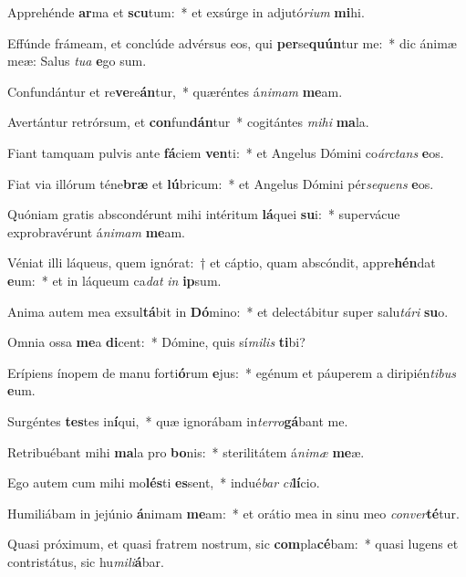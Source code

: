 \item Apprehénde \textbf{ar}ma et \textbf{scu}tum:~* et exsúrge in adjutó\textit{ri}\textit{um} \textbf{mi}hi.
\item Effúnde frámeam, et conclúde advérsus eos, qui \textbf{per}se\textbf{quún}tur me:~* dic ánimæ meæ: Salus \textit{tu}\textit{a} \textbf{e}go sum.
\item Confundántur et re\textbf{ve}re\textbf{án}tur,~* quæréntes á\textit{ni}\textit{mam} \textbf{me}am.
\item Avertántur retrórsum, et \textbf{con}fun\textbf{dán}tur~* cogitántes \textit{mi}\textit{hi} \textbf{ma}la.
\item Fiant tamquam pulvis ante \textbf{fá}ciem \textbf{ven}ti:~* et Angelus Dómini co\textit{árc}\textit{tans} \textbf{e}os.
\item Fiat via illórum téne\textbf{bræ} et \textbf{lú}bricum:~* et Angelus Dómini pér\textit{se}\textit{quens} \textbf{e}os.
\item Quóniam gratis abscondérunt mihi intéritum \textbf{lá}quei \textbf{su}i:~* supervácue exprobravérunt á\textit{ni}\textit{mam} \textbf{me}am.
\item Véniat illi láqueus, quem ignórat:~† et cáptio, quam abscóndit, appre\textbf{hén}dat \textbf{e}um:~* et in láqueum ca\textit{dat} \textit{in} \textbf{ip}sum.
\item Anima autem mea exsul\textbf{tá}bit in \textbf{Dó}mino:~* et delectábitur super salu\textit{tá}\textit{ri} \textbf{su}o.
\item Omnia ossa \textbf{me}a \textbf{di}cent:~* Dómine, quis sí\textit{mi}\textit{lis} \textbf{ti}bi?
\item Erípiens ínopem de manu forti\textbf{ó}rum \textbf{e}jus:~* egénum et páuperem a diripién\textit{ti}\textit{bus} \textbf{e}um.
\item Surgéntes \textbf{tes}tes in\textbf{í}qui,~* quæ ignorábam in\textit{ter}\textit{ro}\textbf{gá}bant me.
\item Retribuébant mihi \textbf{ma}la pro \textbf{bo}nis:~* sterilitátem á\textit{ni}\textit{mæ} \textbf{me}æ.
\item Ego autem cum mihi mo\textbf{lés}ti \textbf{es}sent,~* indué\textit{bar} \textit{ci}\textbf{lí}cio.
\item Humiliábam in jejúnio \textbf{á}nimam \textbf{me}am:~* et orátio mea in sinu meo \textit{con}\textit{ver}\textbf{té}tur.
\item Quasi próximum, et quasi fratrem nostrum, sic \textbf{com}pla\textbf{cé}bam:~* quasi lugens et contristátus, sic hu\textit{mi}\textit{li}\textbf{á}bar.

